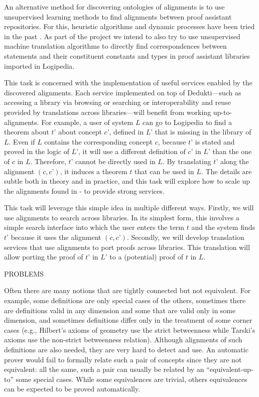 An alternative method for discovering ontologies of alignments is
to use unsupervised learning methods to find alignments between proof
assistant repositories. For this, heuristic algorithms and dynamic
processes have been tried in the past \cite{???}.  As part of the
project we intend to also try to use unsupervised machine translation
algorithms \cite{???} to directly find correspondences between
statements and their constituent constants and types in proof
assistant libraries imported in Logipedia.

This task is concerned with the implementation of useful services
enabled by the discovered alignments. Each service implemented on top
of Dedukti---such as accessing a library via browsing or searching
or interoperability and reuse provided by translations across
libraries---will benefit from working up-to-alignments. For example, a
user of system $L$ can go to Logipedia to find a theorem about $t’$
about concept $c’$, defined in $L’$ that is missing in the library of
$L$. Even if $L$ contains the corresponding concept $c$, because $t’$
is stated and proved in the logic of $L’$, it will use a
different definition of $c’$ in $L’$ than the one of $c$ in $L$.
Therefore, $t’$ cannot be directly used in $L$. By translating $t’$
along the alignment $(c,c’)$, it induces a theorem $t$ that can be
used in $L$. The details are subtle both in theory and in practice,
and this task will explore how to scale up the alignments found in
- to
provide strong services.

This task will leverage this simple idea in multiple different
ways. Firstly, we will use alignments to search across libraries. In
its simplest form, this involves a simple search interface into which
the user enters the term $t$ and the system finds $t’$ because it uses
the alignment $(c,c’)$. Secondly, we will develop translation services
that use alignments to port proofs across libraries. This translation
will allow porting the proof of $t’$ in $L’$ to a (potential) proof of
$t$ in $L$.


{\color{red} PROBLEMS}

Often there are many notions that are tightly connected but not
equivalent. For example, some definitions are only special cases of
the others, sometimes there are definitions valid in any dimension and
some that are valid only in some dimension, and sometimes definitions
differ only in the treatment of some corner cases (e.g., Hilbert's
axioms of geometry use the strict betweenness while Tarski's axioms
use the non-strict betweenness relation).  Although alignments of such
definitions are also needed, they are very hard to detect and use. An
automatic prover would fail to formally relate such a pair of concepts
since they are not equivalent: all the same, such a pair can usually
be related by an ``equivalent-up-to'' some special cases.  While some
equivalences are trivial, others equivalences can be expected to be
proved automatically.

